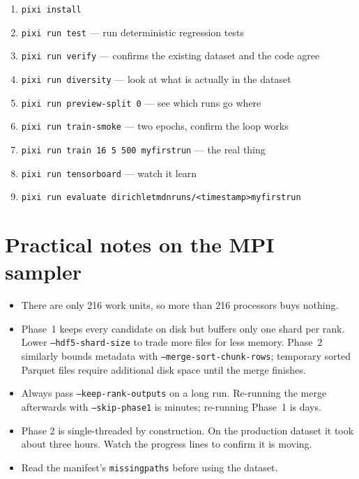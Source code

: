 \documentclass[11pt,a4paper]{report}
\newcommand{\code}[1]{\texttt{#1}}
\renewcommand{\_}{\origtextunderscore\allowbreak}
\begin{document}
\begin{enumerate}
  \item \code{pixi install}
  \item \code{pixi run test} --- run deterministic regression tests
  \item \code{pixi run verify} --- confirms the existing dataset and the code agree
  \item \code{pixi run diversity} --- look at what is actually in the dataset
  \item \code{pixi run preview-split 0} --- see which runs go where
  \item \code{pixi run train-smoke} --- two epochs, confirm the loop works
  \item \code{pixi run train 16 5 500 my\_first\_run} --- the real thing
  \item \code{pixi run tensorboard} --- watch it learn
  \item \code{pixi run evaluate dirichlet\_mdn\_runs/<timestamp>\_my\_first\_run}
\end{enumerate}

\section{Practical notes on the MPI sampler}

\begin{itemize}
  \item There are only 216 work units, so more than 216 processors buys nothing.
  \item Phase~1 keeps every candidate on disk but buffers only one shard per rank. Lower
        \code{--hdf5-shard-size} to trade more files for less memory. Phase~2 similarly bounds
        metadata with \code{--merge-sort-chunk-rows}; temporary sorted Parquet files require
        additional disk space until the merge finishes.
  \item Always pass \code{--keep-rank-outputs} on a long run. Re-running the merge afterwards
        with \code{--skip-phase1} is minutes; re-running Phase~1 is days.
  \item Phase 2 is single-threaded by construction. On the production dataset it took about
        three hours. Watch the progress lines to confirm it is moving.
  \item Read the manifest's \code{missing\_paths} before using the dataset.
\end{itemize}

\end{document}
